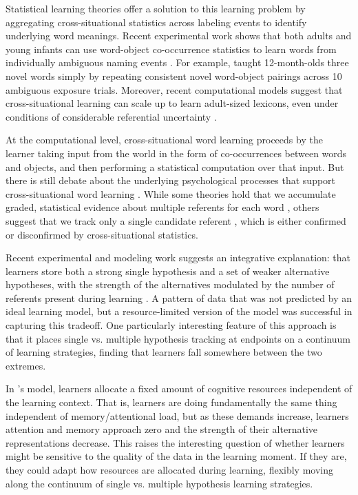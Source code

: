 \documentclass[10pt,letterpaper]{article}
\begin{document}
Statistical learning theories offer a solution to this learning problem by aggregating cross-situational statistics across labeling events to identify underlying word meanings. Recent experimental work shows that both adults and young infants can use word-object co-occurrence statistics to learn words from individually ambiguous naming events \cite{smith2008infants, vouloumanos2008fine}. For example,  taught 12-month-olds three novel words simply by repeating consistent novel word-object pairings across 10 ambiguous exposure trials. Moreover, recent computational models suggest that cross-situational learning can scale up to learn adult-sized lexicons, even under conditions of considerable referential uncertainty \cite{smith2011cross}.

At the computational level, cross-situational word learning proceeds by the learner taking input from the world in the form of co-occurrences between words and objects, and then performing a statistical computation over that input. But there is still debate about the underlying psychological processes that support cross-situational word learning \cite{smith2014unrealized}. While some theories hold that we accumulate graded, statistical evidence about multiple referents for each word \cite{mcmurray2012word}, others suggest that we track only a single candidate referent \cite{trueswell2013propose}, which is either confirmed or disconfirmed by cross-situational statistics. 

Recent experimental and modeling work suggests an integrative explanation: that learners store both a strong single hypothesis and a set of weaker alternative hypotheses, with the strength of the alternatives modulated by the number of referents present during learning \cite{yurovsky2014algorithmic}. A pattern of data that was not predicted by an ideal learning model, but a resource-limited version of the model was successful in capturing this tradeoff. One particularly interesting feature of this approach is that it places single vs. multiple hypothesis tracking at endpoints on a continuum of learning strategies, finding that learners fall somewhere between the two extremes. 

In 's model, learners allocate a fixed amount of cognitive resources independent of the learning context. That is, learners are doing fundamentally the same thing independent of memory/attentional load, but as these demands increase, learners attention and memory approach zero and the strength of their alternative representations decrease. This raises the interesting question of whether learners might be sensitive to the quality of the data in the learning moment. If they are, they could adapt how resources are allocated during learning, flexibly moving along the continuum of single vs. multiple hypothesis learning strategies. 
\end{document}
